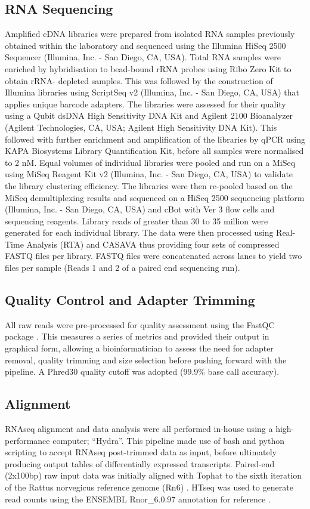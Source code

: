 \subsection{RNA Sequencing} \label{method_n=3}
Amplified cDNA libraries were prepared from isolated RNA samples previously obtained within the laboratory and sequenced using the Illumina HiSeq 2500 Sequencer (Illumina, Inc. - San Diego, CA, USA). Total RNA samples were enriched by hybridisation to bead-bound rRNA probes using Ribo Zero Kit to obtain rRNA- depleted samples. This was followed by the construction of Illumina libraries using ScriptSeq v2 (Illumina, Inc. - San Diego, CA, USA) that applies unique barcode adapters. The libraries were assessed for their quality using a Qubit dsDNA High Sensitivity DNA Kit and Agilent 2100 Bioanalyzer (Agilent Technologies, CA, USA; Agilent High Sensitivity DNA Kit). This followed with further enrichment and amplification of the libraries by qPCR using KAPA Biosystems Library Quantification Kit, before all samples were normalised to 2 nM. Equal volumes of individual libraries were pooled and run on a MiSeq using MiSeq Reagent Kit v2 (Illumina, Inc. - San Diego, CA, USA) to validate the library clustering efficiency. The libraries were then re-pooled based on the MiSeq demultiplexing results and sequenced on a HiSeq 2500 sequencing platform (Illumina, Inc. - San Diego, CA, USA) and cBot with Ver 3 flow cells and sequencing reagents. Library reads of greater than 30 to 35 million were generated for each individual library. The data were then processed using Real-Time Analysis (RTA) and CASAVA thus providing four sets of compressed FASTQ files per library. FASTQ files were concatenated across lanes to yield two files per sample (Reads 1 and 2 of a paired end sequencing run). 

\subsection{Quality Control and Adapter Trimming}
All raw reads were pre-processed for quality assessment using the FastQC package \cite{Andrews2010}. This measures a series of metrics and provided their output in graphical form, allowing a bioinformatician to assess the need for adapter removal, quality trimming and size selection before pushing forward with the pipeline. A Phred30 quality cutoff was adopted (99.9\% base call accuracy).

\subsection{Alignment}
RNAseq alignment and data analysis were all performed in-house using a high-performance computer; “Hydra”. This pipeline made use of bash and python scripting to accept RNAseq post-trimmed data as input, before ultimately producing output tables of differentially expressed transcripts. Paired-end (2x100bp) raw input data was initially aligned with Tophat to the sixth iteration of the Rattus norvegicus reference genome (Rn6) \cite{Trapnell2009}. HTseq was used to generate read counts using the ENSEMBL Rnor\_6.0.97 annotation for reference \cite{Anders2015}. 

